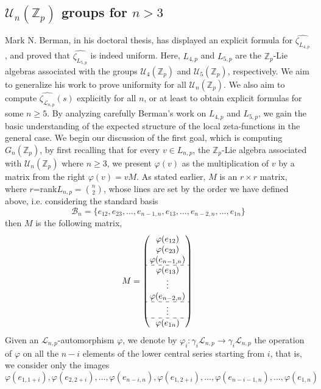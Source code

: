 \documentclass[12pt]{article}
\begin{document}
\subsection{$\mathcal{U}_n(\mathbb{Z}_p)$ groups for $n>3$}
Mark N. Berman, in his doctoral thesis\cite{Berman}, has displayed an explicit formula for $\hat{\zeta_{L_{4,p}}}$, and proved that $\hat{\zeta_{L_{5,p}}}$ is indeed uniform. Here, $L_{4,p}$ and $L_{5,p}$ are the $\mathbb{Z}_p$-Lie algebras associated with the groups $\mathcal{U}_4(\mathbb{Z}_p)$ and $\mathcal{U}_5(\mathbb{Z}_p)$, respectively. We aim to generalize his work to prove uniformity for all $\mathcal{U}_n(\mathbb{Z}_p)$. We also aim to compute $\hat{\zeta_{\mathcal{L}_{n,p}}}(s)$ explicitly for all $n$, or at least to obtain explicit formulas for some $n\geq 5$. By analyzing carefully Berman's work on $L_{4,p}$ and $L_{5,p}$, we gain the basic understanding of the expected structure of the local zeta-functions in the general case.
We begin our discussion of the first goal, which is computing $G_n(\mathbb{Z}_p)$, by first recalling that for every $v\in L_{n,p}$, the $\mathbb{Z}_p$-Lie algebra associated with $\mathcal{U}_n(\mathbb{Z}_p)$ where $n\geq3$, we present $\varphi(v)$ as the multiplication of $v$ by a matrix from the right $\varphi(v)=vM$. As stated earlier, $M$ is an $r\times r$ matrix, where $r$=rank$L_{n,p}=\binom{n}{2}$, whose lines are set by the order we have defined above, i.e. considering the standard basis \[\mathcal{B}_n=\{e_{
12},e_{23},\dots,e_{n-1,n},e_{13},\dots,e_{n-2,n},\dots,e_{1n}\}\] then $M$ is the following matrix,
$$
M=\begin{pmatrix}
\varphi(e_{12})\\
\varphi(e_{23})\\
\varphi(e_{n-1,n})\\
\hdashline
\varphi(e_{13})\\
\vdots\\
\varphi(e_{n-2,n})\\
\hdashline
\vdots\\
\hdashline
\varphi(e_{1n})\\
\end{pmatrix}\\
$$
Given an $\mathcal{L}_{n,p}$-automorphism $\varphi$, we denote by $\varphi_i:\gamma_i\mathcal{L}_{n,p}\rightarrow\gamma_i\mathcal{L}_{n,p}$ the operation of $\varphi$ on all the $n-i$ elements of the lower central series starting from $i$, that is, we consider only the images \[\varphi(e_{1,1+i}),\varphi(e_{2,2+i}),\dots,\varphi(e_{n-i,n}),\varphi(e_{1,2+i}),\dots,\varphi(e_{n-i-1,n}),\dots,\varphi(e_{1,n})\]
\end{document}
